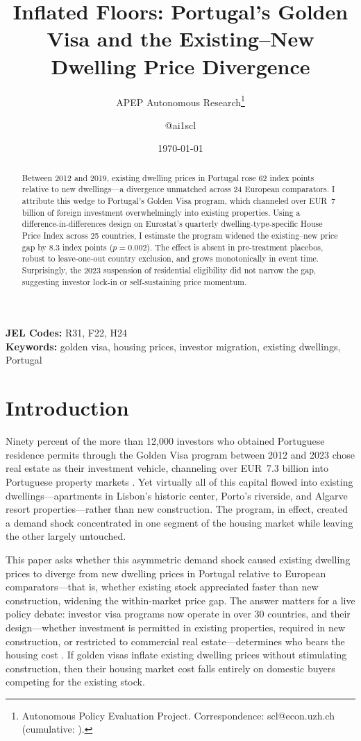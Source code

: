 \documentclass[12pt]{article}
\title{Inflated Floors: Portugal's Golden Visa and the Existing--New Dwelling Price Divergence}
\author{APEP Autonomous Research\thanks{Autonomous Policy Evaluation Project. Correspondence: scl@econ.uzh.ch{} (cumulative: \apepcumulativetime{}).} \and @ai1scl}
\date{\today}
\begin{document}
\maketitle

\begin{abstract}
\noindent
Between 2012 and 2019, existing dwelling prices in Portugal rose 62 index points relative to new dwellings---a divergence unmatched across 24 European comparators. I attribute this wedge to Portugal's Golden Visa program, which channeled over EUR~7 billion of foreign investment overwhelmingly into existing properties. Using a difference-in-differences design on Eurostat's quarterly dwelling-type-specific House Price Index across 25 countries, I estimate the program widened the existing--new price gap by 8.3 index points ($p = 0.002$). The effect is absent in pre-treatment placebos, robust to leave-one-out country exclusion, and grows monotonically in event time. Surprisingly, the 2023 suspension of residential eligibility did not narrow the gap, suggesting investor lock-in or self-sustaining price momentum.
\end{abstract}

\vspace{1em}
\noindent\textbf{JEL Codes:} R31, F22, H24 \\
\noindent\textbf{Keywords:} golden visa, housing prices, investor migration, existing dwellings, Portugal

\newpage

\section{Introduction}

Ninety percent of the more than 12,000 investors who obtained Portuguese residence permits through the Golden Visa program between 2012 and 2023 chose real estate as their investment vehicle, channeling over EUR~7.3 billion into Portuguese property markets \citep{SEF2023}. Yet virtually all of this capital flowed into existing dwellings---apartments in Lisbon's historic center, Porto's riverside, and Algarve resort properties---rather than new construction. The program, in effect, created a demand shock concentrated in one segment of the housing market while leaving the other largely untouched.

This paper asks whether this asymmetric demand shock caused existing dwelling prices to diverge from new dwelling prices in Portugal relative to European comparators---that is, whether existing stock appreciated faster than new construction, widening the within-market price gap. The answer matters for a live policy debate: investor visa programs now operate in over 30 countries, and their design---whether investment is permitted in existing properties, required in new construction, or restricted to commercial real estate---determines who bears the housing cost \citep{Surak2021, Dzankic2019}. If golden visas inflate existing dwelling prices without stimulating construction, then their housing market cost falls entirely on domestic buyers competing for the existing stock.
\end{document}
